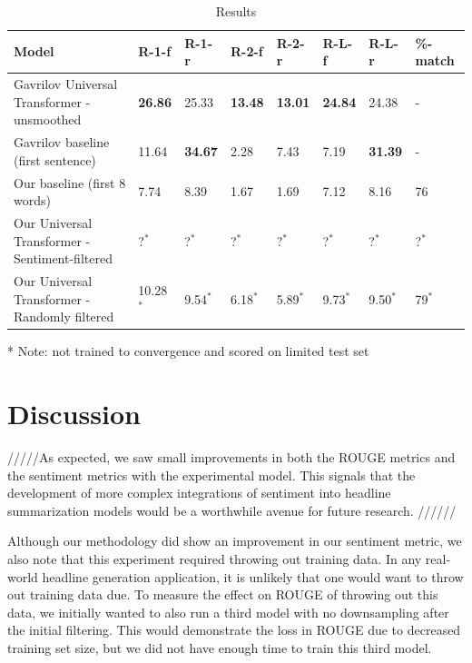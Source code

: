 \documentclass[11pt]{article}
\begin{document}
\begin{table}[h!]
\begin{threeparttable}
\centering
\begin{small}
\begin{tabular}{|p{7cm}|p{.8cm}|p{.8cm}|p{.8cm}|p{.8cm}|p{.8cm}|p{.8cm}|p{1.3cm}|}
 \hline
 Model & R-1-f & R-1-r & R-2-f & R-2-r & R-L-f & R-L-r & \%-match \\
 \hline
 Gavrilov Universal Transformer - unsmoothed & \textbf{26.86} & 25.33 & \textbf{13.48} & \textbf{13.01} & \textbf{24.84} & 24.38 & - \\ [0.5ex] 
 Gavrilov baseline (first sentence) & 11.64 & \textbf{34.67} & 2.28 & 7.43 & 7.19 & \textbf{31.39} & - \\ 
 Our baseline (first 8 words) & 7.74 & 8.39 & 1.67 & 1.69 & 7.12 & 8.16 & 76 \\
 Our Universal Transformer - Sentiment-filtered & ?$^{*}$ & ?$^{*}$ & ?$^{*}$ & ?$^{*}$ & ?$^{*}$ & ?$^{*}$ & ?$^{*}$ \\
 Our Universal Transformer - Randomly filtered & 10.28$^{*}$ & 9.54$^{*}$ & 6.18$^{*}$ & 5.89$^{*}$ & 9.73$^{*}$ & 9.50$^{*}$ & 79$^{*}$ \\ [1ex]
 \hline
\end{tabular}
\end{small}
\begin{tablenotes}\footnotesize
\item[*] Note: not trained to convergence and scored on limited test set
\end{tablenotes}
\caption{Results}
\end{threeparttable}
\label{table:results}
\end{table}

\section{Discussion}

/////As expected, we saw small improvements in both the ROUGE metrics and the sentiment metrics with the experimental model. This signals that the development of more complex integrations of sentiment into headline summarization models would be a worthwhile avenue for future research. //////

Although our methodology did show an improvement in our sentiment metric, we also note that this experiment required throwing out training data. In any real-world headline generation application, it is unlikely that one would want to throw out training data due. To measure the effect on ROUGE of throwing out this data, we initially wanted to also run a third model with no downsampling after the initial filtering. This would demonstrate the loss in ROUGE due to decreased training set size, but we did not have enough time to train this third model.
\end{document}
